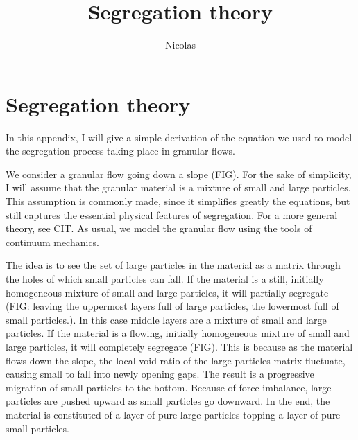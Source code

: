 \documentclass[11pt]{book}
\title{\textbf{Segregation theory}}
\author{Nicolas}
\date{}
\begin{document}
\chapter{Segregation theory}

In this appendix, I will give a simple derivation of the equation we used to model the segregation process taking place in granular flows.

We consider a granular flow going down a slope (FIG). For the sake of simplicity, I will assume that the granular material is a mixture of small and large particles. This assumption is commonly made, since it simplifies greatly the equations, but still captures the essential physical features of segregation. For a more general theory, see CIT.
As usual, we model the granular flow using the tools of continuum mechanics. 

The idea is to see the set of large particles in the material as a matrix through the holes of which small particles can fall. 
If the material is a still, initially homogeneous mixture of small and large particles, it will partially segregate (FIG: leaving the uppermost layers full of large particles, the lowermost full of small particles.). In this case middle layers are a mixture of small and large particles.
If the material is a flowing, initially homogeneous mixture of small and large particles, it will completely segregate (FIG). This is because as the material flows down the slope, the local void ratio of the large particles matrix fluctuate, causing small to fall into newly opening gaps. The result is a progressive migration of small particles to the bottom. Because of force imbalance, large particles are pushed upward as small particles go downward. In the end, the material is constituted of a layer of pure large particles topping a layer of pure small particles.
\end{document}
